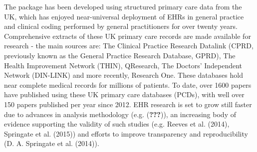\documentclass[]{article}
\begin{document}
The package has been developed using structured primary care data from
the UK, which has enjoyed near-universal deployment of EHRs in general
practice and clinical coding performed by general practitioners for over
twenty years. Comprehensive extracts of these UK primary care records
are made available for research - the main sources are: The Clinical
Practice Research Datalink (CPRD, previously known as the General
Practice Research Database, GPRD), The Health Improvement Network
(THIN), QResearch, The Doctors' Independent Network (DIN-LINK) and more
recently, Research One. These databases hold near complete medical
records for millions of patients. To date, over 1600 papers have
published using these UK primary care databases (PCDs), with well over
150 papers published per year since 2012. EHR research is set to grow
still faster due to advances in analysis methodology (e.g.
({\textbf{???}})), an increasing body of evidence supporting the
validity of such studies (e.g. Reeves et al. (2014), Springate et al.
(2015)) and efforts to improve transparency and reproducibility (D. A.
Springate et al. (2014)).
\end{document}
